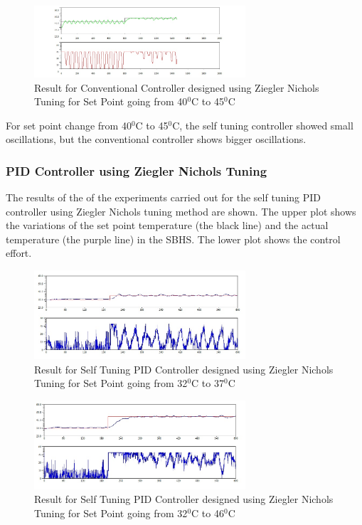 \begin{figure}[h]
		\centering
\includegraphics[width=0.7\textwidth]{Vikas_self/report_tex/PID_results/Conventional_Tuning/Setpointchange/PI/step40to45.jpg}
	\caption{Result for Conventional Controller designed using Ziegler Nichols Tuning for Set Point going from 40$^0$C to 45$^0$C }
\end{figure}

For set point change from 40$^0$C to 45$^0$C, the self tuning controller showed small oscillations, but the conventional controller shows bigger oscillations.
\newpage


\subsubsection{PID Controller using Ziegler Nichols Tuning}\label{pidzn}
The results of the of the experiments carried out for the self tuning PID controller using Ziegler Nichols tuning method are shown. The upper plot shows the variations of the set point temperature (the black line) and the actual temperature (the purple line) in the SBHS. The lower plot shows the control effort.

\begin{figure}[h]
	\centering
\includegraphics[width=0.7\textwidth]{Vikas_self/report_tex/PID_results/self_tuning/NewSetpoint_change/PID/step32to37.jpg}
	\caption{Result for Self Tuning PID Controller designed using Ziegler Nichols Tuning for Set Point going from 32$^0$C to 37$^0$C}
\end{figure}


\begin{figure}[h]
	\centering
\includegraphics[width=0.7\textwidth]{Vikas_self/report_tex/PID_results/self_tuning/NewSetpoint_change/PID/step32to46.jpg}
	\caption{Result for Self Tuning PID Controller designed using Ziegler Nichols Tuning for Set Point going from 32$^0$C to 46$^0$C}
\end{figure}


